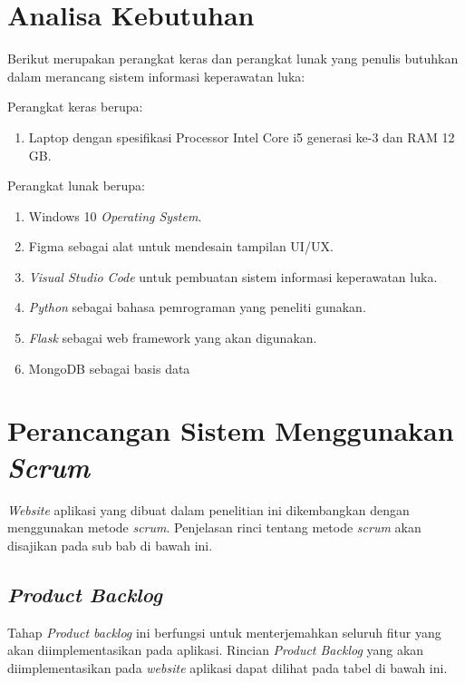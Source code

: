 \section{Analisa Kebutuhan}
Berikut merupakan perangkat keras dan perangkat lunak yang penulis butuhkan dalam merancang sistem informasi keperawatan luka:

Perangkat keras berupa:
\begin{enumerate}
	
\item Laptop dengan spesifikasi Processor Intel Core i5 generasi ke-3 dan RAM 12 GB.
	
\end{enumerate}

Perangkat lunak berupa:
\begin{enumerate}
\item Windows 10 \emph{Operating System}.

\item Figma sebagai alat untuk mendesain tampilan UI/UX.

\item \emph{Visual Studio Code} untuk pembuatan sistem informasi keperawatan luka.

\item \emph{Python} sebagai bahasa pemrograman yang peneliti gunakan.

\item \emph{Flask} sebagai web framework yang akan digunakan.

\item MongoDB sebagai basis data
\end{enumerate}

\section{Perancangan Sistem Menggunakan \emph{Scrum}}

\emph{Website} aplikasi yang dibuat dalam penelitian ini dikembangkan dengan menggunakan metode \emph{scrum}. Penjelasan rinci tentang metode \emph{scrum} akan disajikan pada sub bab di bawah ini.

\subsection{\emph{Product Backlog}}

Tahap \emph{Product backlog} ini berfungsi untuk menterjemahkan seluruh fitur yang akan diimplementasikan pada aplikasi. Rincian \emph{Product Backlog} yang akan diimplementasikan pada \emph{website} aplikasi dapat dilihat pada tabel di bawah ini.

